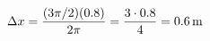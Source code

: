 \documentclass[preview]{standalone}
\begin{document}
\begin{align*}
\special{dvisvgm:raw <g id='unique000'>}\Delta x = \frac{(3\pi/2)(0.8)}{2\pi} = \frac{3 \cdot 0.8}{4} = 0.6\,\mathrm{m}\special{dvisvgm:raw </g>}
\end{align*}
\end{document}
